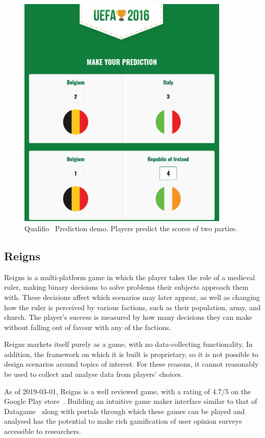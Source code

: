 \begin{figure}[!h]
	\centering
	\includegraphics[width=0.9\textwidth]{./images/context/pred.png}
	\caption{Qualifio~\cite{Qualifio} Prediction demo. Players predict the scores of two parties.}
	\label{fig:pred}
\end{figure}

\subsection{Reigns}
Reigns is a multi-platform game in which the player takes the role of a medieval ruler, making binary decisions to solve problems their subjects approach them with. 
These decisions affect which scenarios may later appear, as well as changing how the ruler is perceived by various factions, such as their population, army, and church. 
The player's success is measured by how many decisions they can make without falling out of favour with any of the factions.

Reigns markets itself purely as a game, with no data-collecting functionality. In addition, the framework on which it is built is proprietary, so it is not possible to design scenarios around topics of interest. For these reasons, it cannot reasonably be used to collect and analyse data from players' choices. 

As of 2019-03-01, Reigns is a well reviewed game, with a rating of 4.7/5 on the Google Play store~\cite{GooglePlay}.
Building an intuitive game maker interface similar to that of Datagame~\cite{Datagame} along with portals through which these games can be played and analysed has the potential to make rich gamification of user opinion surveys accessible to researchers.
